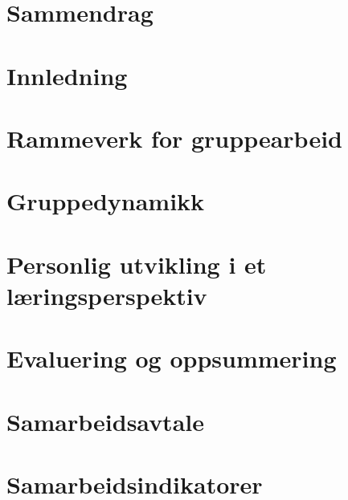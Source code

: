 \documentclass[11pt, a4paper]{report}
\begin{document}

\chapter{Sammendrag}

\newpage

\tableofcontents
\listoftables
\listoffigures
\newpage

\chapter{Innledning}


\chapter{Rammeverk for gruppearbeid}


\chapter{Gruppedynamikk}


\chapter{Personlig utvikling i et læringsperspektiv}


\chapter{Evaluering og oppsummering}


\newpage
\appendix
{}
\chapter{Samarbeidsavtale}

\chapter{Samarbeidsindikatorer}





\end{document}
